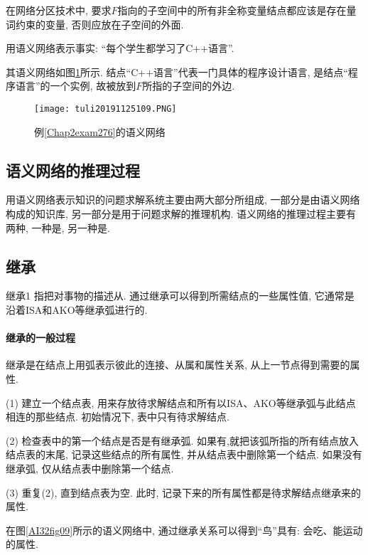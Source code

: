 \begin{remark}
    在网络分区技术中, 要求$F$指向的子空间中的所有非全称变量结点都应该是存在量词约束的变量, 否则应放在子空间的外面.
\end{remark}

\begin{example}\label{Chap2exam276}
用语义网络表示事实: “每个学生都学习了C++语言”.
\end{example}
其语义网络如图\ref{AI32fig109}所示. 结点“C++语言”代表一门具体的程序设计语言, 是结点“程序语言”的一个实例, 故被放到$F$所指的子空间的外边.
\begin{figure}[H]
\centering
\texttt{[image: tuli20191125109.PNG]}
\caption{例\ref{Chap2exam276}的语义网络}
\label{AI32fig109}
\end{figure}
\subsection{语义网络的推理过程}
用语义网络表示知识的问题求解系统主要由两大部分所组成, 一部分是由语义网络构成的知识库, 另一部分是用于问题求解的推理机构.
语义网络的推理过程主要有两种, 一种是, 另一种是.
\subsection{继承}
\begin{mydef}{继承}{1}
指把对事物的描述从. 通过继承可以得到所需结点的一些属性值, 它通常是沿着ISA和AKO等继承弧进行的.
\end{mydef}
\paragraph{继承的一般过程} 继承是在结点上用弧表示彼此的连接、从属和属性关系,  从上一节点得到需要的属性.

(1) 建立一个结点表, 用来存放待求解结点和所有以ISA、AKO等继承弧与此结点相连的那些结点. 初始情况下, 表中只有待求解结点.

(2) 检查表中的第一个结点是否是有继承弧. 如果有,就把该弧所指的所有结点放入结点表的末尾, 记录这些结点的所有属性, 并从结点表中删除第一个结点. 如果没有继承弧, 仅从结点表中删除第一个结点.

(3) 重复(2), 直到结点表为空. 此时, 记录下来的所有属性都是待求解结点继承来的属性.
\begin{example}
  在图\ref{AI32fig09}所示的语义网络中, 通过继承关系可以得到“鸟”具有: 会吃、能运动的属性.
\end{example}
